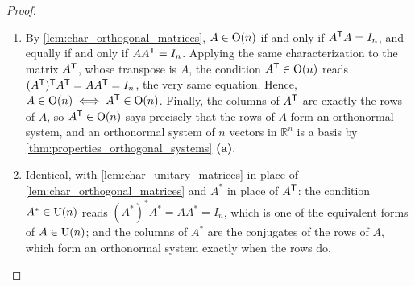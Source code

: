 \begin{proof}
\begin{enumerate}[label=\textbf{(\alph*)}]
    \item By \cref{lem:char_orthogonal_matrices}, $A \in \operatorname{O}(n)$ if and only if $A^{\mathsf{T}} A = I_n$, and equally if and only if $A A^{\mathsf{T}} = I_n$. Applying the same characterization to the matrix $A^{\mathsf{T}}$, whose transpose is $A$, the condition $A^{\mathsf{T}} \in \operatorname{O}(n)$ reads $(A^{\mathsf{T}})^{\mathsf{T}} A^{\mathsf{T}} = A A^{\mathsf{T}} = I_n$, the very same equation. Hence, $A \in \operatorname{O}(n) \iff A^{\mathsf{T}} \in \operatorname{O}(n)$. Finally, the columns of $A^{\mathsf{T}}$ are exactly the rows of $A$, so $A^{\mathsf{T}} \in \operatorname{O}(n)$ says precisely that the rows of $A$ form an orthonormal system, and an orthonormal system of $n$ vectors in $\mathbb{R}^n$ is a basis by \cref{thm:properties_orthogonal_systems} \textbf{(a)}.
    \item Identical, with \cref{lem:char_unitary_matrices} in place of \cref{lem:char_orthogonal_matrices} and $A^*$ in place of $A^{\mathsf{T}}$: the condition $A^* \in \operatorname{U}(n)$ reads $(A^*)^* A^* = A A^* = I_n$, which is one of the equivalent forms of $A \in \operatorname{U}(n)$; and the columns of $A^*$ are the conjugates of the rows of $A$, which form an orthonormal system exactly when the rows do. \qedhere
\end{enumerate}
\end{proof}

